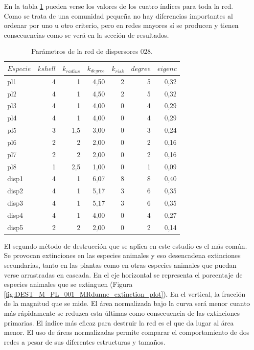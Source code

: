 En la tabla \ref{tab:pars_SD_028} pueden verse los valores de los cuatro índices para toda la red. Como se trata de una comunidad pequeña no hay diferencias importantes
al ordenar por uno u otro criterio, pero en redes mayores sí se producen y tienen consecuencias como se verá en la sección de resultados.



\begin{table}[htbp]
  \centering
  \normalsize
    \begin{tabular}{lrrrrrr}
    \toprule
    $Especie$ & $k shell$ & ${k}_{radius}$ & ${k}_{degree}$ & ${k}_{risk}$ & $degree$ & $eigenc$ \\
\midrule
    pl1  & 4    & 1    & 4,50 & 2    & 5    & 0,32 \\
    pl2  & 4    & 1    & 4,50 & 2    & 5    & 0,32 \\
    pl3  & 4    & 1    & 4,00 & 0    & 4    & 0,29 \\
    pl4  & 4    & 1    & 4,00 & 0    & 4    & 0,29 \\
    pl5  & 3    & 1,5  & 3,00 & 0    & 3    & 0,24 \\
    pl6  & 2    & 2    & 2,00 & 0    & 2    & 0,16 \\
    pl7  & 2    & 2    & 2,00 & 0    & 2    & 0,16 \\
    pl8  & 1    & 2,5  & 1,00 & 0    & 1    & 0,09 \\
    disp1 & 4    & 1    & 6,07 & 8    & 8    & 0,40 \\
    disp2 & 4    & 1    & 5,17 & 3    & 6    & 0,35 \\
    disp3 & 4    & 1    & 5,17 & 3    & 6    & 0,35 \\
    disp4 & 4    & 1    & 4,00 & 0    & 4    & 0,27 \\
    disp5 & 2    & 2    & 2,00 & 0    & 2    & 0,14 \\
    \bottomrule
    \end{tabular}%
    \caption{Parámetros de la red de dispersores $028$.}
  \label{tab:pars_SD_028}%
\end{table}%

El segundo método de destrucción que se aplica en este estudio es el más común. Se provocan extinciones en las especies animales y eso desencadena extinciones secundarias, tanto en las plantas como en otras especies animales que puedan verse arrastradas en cascada. 
En el eje horizontal se representa el porcentaje de especies animales que se extinguen (Figura \ref{fig:DEST_M_PL_001_MRdunne_extinction_plot}). En el vertical, la fracción de la magnitud que se mide. El área normalizada bajo la curva será menor cuanto más rápidamente se reduzca esta últimas como consecuencia de las extinciones primarias. El índice más eficaz para destruir la red es el que da lugar al área menor. El uso de áreas normalizadas permite comparar el comportamiento de dos redes a pesar de sus diferentes estructuras y tamaños.

